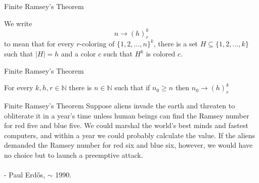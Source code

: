 \documentclass{beamer}
\newcommand{\vs}{\\~\\}
\begin{document}
\begin{frame}{Finite Ramsey's Theorem}
  \begin{definition}
    We write
    $$n\to(h)^k_r$$
    to mean that for every $r$-coloring of $\{1, 2, \ldots, n\}^k$,
    there is a set $H\subseteq\{1, 2, \ldots, k\}$ such that $|H|=h$ and a color $c$
    such that $H^k$ is colored $c$.
  \end{definition}


\end{frame}

\begin{frame}{Finite Ramsey's Theorem}
  \begin{theorem}
    For every $k, h, r\in\mathbb{N}$ there is $n\in\mathbb{N}$ such that
    if $n_0 \geq n$ then $n_0 \to (h)^k_r$
  \end{theorem}

\end{frame}

\begin{frame}{Finite Ramsey's Theorem}
  Suppose aliens invade the earth and threaten to obliterate it in a year's
  time unless human beings can find the Ramsey number for red five and blue five.
  We could marshal the world's best minds and fastest computers, and within a
  year we could probably calculate the value. If the aliens demanded the Ramsey
  number for red six and blue six, however, we would have no choice but to launch
  a preemptive attack.
  \vs
  - Paul Erd\H{o}s, $\sim$ 1990.
\end{frame}
\end{document}
